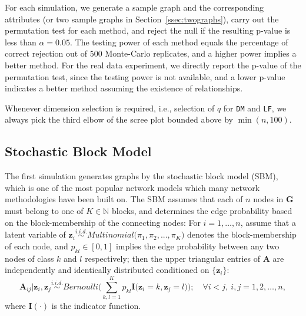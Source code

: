 \documentclass[12pt]{article}
\theoremstyle{definition}
\begin{document}
	For each simulation, we generate a sample graph and the corresponding attributes (or two sample graphs in Section~\ref{ssec:twographs}), carry out the permutation test for each method, and reject the null if the resulting p-value is less than $\alpha = 0.05$. The testing power of each method equals the percentage of correct rejection out of $500$ Monte-Carlo replicates, and a higher power implies a better method. For the real data experiment, we directly report the p-value of the permutation test, since the testing power is not available, and a lower p-value indicates a better method assuming the existence of relationships. 
	
	Whenever dimension selection is required, i.e., selection of $q$ for \texttt{DM} and \texttt{LF}, we always pick the third elbow of the scree plot bounded above by $\min(n, 100)$. 
	
	\subsection{Stochastic Block Model}
	
	The first simulation generates graphs by the stochastic block model (SBM), which is one of the most popular network models which many network methodologies have been built on. The SBM assumes that each of $n$ nodes in $\mathbf{G}$ must belong to one of $K \in \mathbb{N}$ blocks, and determines the edge probability based on the block-membership of the connecting nodes: For $i=1,\ldots,n$, assume that a latent variable of $\mathbf{z}_{i} \overset{i.i.d.}{\sim} Multinomial\big( \pi_{1}, \pi_{2}, ... , \pi_{K} \big)$ denotes the block-membership of each node, and $p_{kl} \in [0,1]$ implies the edge probability between any two nodes of class $k$ and $l$ respectively; then the upper triangular entries of $\mathbf{A}$ are independently and identically distributed conditioned on $\{\mathbf{z}_{i}\}$:
	\begin{equation} 
	\mathbf{A}_{ij} \big| \mathbf{z}_{i}, \mathbf{z}_{j} \overset{i.i.d.}{\sim} Bernoulli\big( \sum\limits_{k,l=1}^{K} p_{kl} \mathbf{I} \big( \mathbf{z}_{i} = k, \mathbf{z}_{j} = l  \big)    \big); \quad \forall  i < j,~i,j = 1,2, \ldots, n,
	\end{equation}
	where $\mathbf{I}(\cdot)$ is the indicator function. %
	
\end{document}
